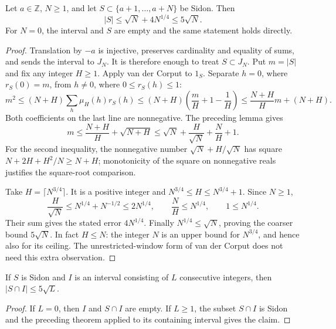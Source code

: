 \begin{theorem}
\leanok
\label{core:sidon-size}
Let $a\in\mathbb Z$, $N\geq1$, and let $S\subset\{a+1,\ldots,a+N\}$
be Sidon.  Then
\[
 |S|\leq\sqrt N+4N^{1/4}\leq5\sqrt N.
\]
For $N=0$, the interval and $S$ are empty and the same statement
holds directly.
\end{theorem}
\begin{proof}
Translation by $-a$ is injective, preserves cardinality and equality
of sums, and sends the interval to $J_N$.  It is therefore enough
to treat $S\subset J_N$.  Put $m=|S|$ and fix any integer $H\geq1$.
Apply van der Corput to $1_S$.  Separate $h=0$, where $r_S(0)=m$,
from $h\ne0$, where $0\leq r_S(h)\leq1$:
\[
 m^2\leq(N+H)\sum_h\mu_H(h)r_S(h)
 \leq(N+H)\left(\frac mH+1-\frac1H\right)
 \leq\frac{N+H}{H}m+(N+H).
\]
Both coefficients on the last line are nonnegative.  The preceding
lemma gives
\[
 m\leq\frac{N+H}{H}+\sqrt{N+H}
   \leq \sqrt N+\frac H{\sqrt N}+\frac NH+1.
\]
For the second inequality, the nonnegative number
$\sqrt N+H/\sqrt N$ has square
$N+2H+H^2/N\geq N+H$; monotonicity of the square on nonnegative
reals justifies the square-root comparison.

Take $H=\lceil N^{3/4}\rceil$.  It is a positive integer and
$N^{3/4}\leq H\leq N^{3/4}+1$.  Since $N\geq1$,
\[
 \frac H{\sqrt N}\leq N^{1/4}+N^{-1/2}\leq2N^{1/4},
 \qquad \frac NH\leq N^{1/4},\qquad 1\leq N^{1/4}.
\]
Their sum gives the stated error $4N^{1/4}$.  Finally
$N^{1/4}\leq\sqrt N$, proving the coarser bound $5\sqrt N$.
In fact $H\leq N$: the integer $N$ is an upper bound for
$N^{3/4}$, and hence also for its ceiling.  The unrestricted-window
form of van der Corput does not need this extra observation.
\end{proof}

\begin{corollary}
\label{core:local-size}
If $S$ is Sidon and $I$ is an interval consisting of $L$ consecutive
integers, then $|S\cap I|\leq5\sqrt L$.
\end{corollary}
\begin{proof}
If $L=0$, then $I$ and $S\cap I$ are empty.  If $L\geq1$,
the subset $S\cap I$ is Sidon and the preceding theorem applied
to its containing interval gives the claim.
\end{proof}

